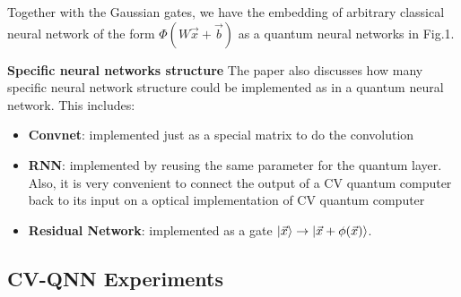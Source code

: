 \documentclass{article}
\begin{document}
Together with the Gaussian gates, we have the embedding of arbitrary classical neural network of the form $\Phi(W\vec{x}+\vec{b})$ as a quantum neural networks in Fig.1.

\textbf{ Specific neural networks structure} The paper also discusses how many specific neural network structure could be  implemented as in a quantum neural network. This includes: 

\begin{itemize}
  \item \textbf{Convnet}: implemented just as a special matrix to do the convolution
  \item \textbf{RNN}: implemented by reusing the same parameter for the quantum layer. Also, it is very convenient to connect the output of a CV quantum computer back to its input on a optical implementation of CV quantum computer
  \item \textbf{Residual Network}: implemented as a gate $\ket{\vec{x}} \to \ket{\vec{x} + \phi(\vec{x})}$.
\end{itemize}

\subsection{ CV-QNN Experiments}
\end{document}
